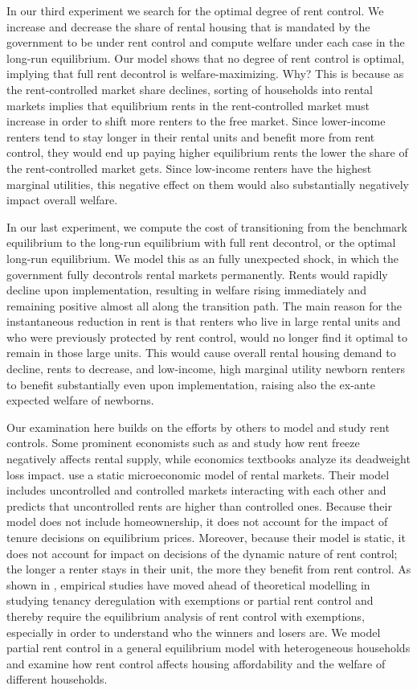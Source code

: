 \documentclass[parskip=full]{article}
\begin{document}
In our third experiment we search for the optimal degree of rent control. We increase and decrease the share of rental housing that is mandated by the government to be under rent control and compute welfare under each case in the long-run equilibrium. Our model shows that no degree of rent control is optimal, implying that full rent decontrol is welfare-maximizing. Why? This is because as the rent-controlled market share declines, sorting of households into rental markets implies that equilibrium rents in the rent-controlled market must increase in order to shift more renters to the free market. Since lower-income renters tend to stay longer in their rental units and benefit more from rent control, they would end up paying higher equilibrium rents the lower the share of the rent-controlled market gets. Since low-income renters have the highest marginal utilities, this negative effect on them would also substantially negatively impact overall welfare. 

In our last experiment, we compute the cost of transitioning from the benchmark equilibrium to the long-run equilibrium with full rent decontrol, or the optimal long-run equilibrium. We model this as an fully unexpected shock, in which the government fully decontrols rental markets permanently. Rents would rapidly decline upon implementation, resulting in welfare rising immediately and remaining positive almost all along the transition path. The main reason for the instantaneous reduction in rent is that renters who live in large rental units and who were previously protected by rent control, would no longer find it optimal to remain in those large units. This would cause overall rental housing demand to decline, rents to decrease, and low-income, high marginal utility newborn renters to benefit substantially even upon implementation, raising also the ex-ante expected welfare of newborns.

Our examination here builds on the efforts by others to model and study rent controls. Some prominent economists such as \citet{hayek-1929} and \citet{fs-1946} study how rent freeze negatively affects rental supply, while economics textbooks analyze its deadweight loss impact. \citet{fallis-1985} use a static microeconomic model of rental markets. Their model includes uncontrolled and controlled markets interacting with each other and predicts that uncontrolled rents are higher than controlled ones. Because their model does not include homeownership, it does not account for the impact of tenure decisions on equilibrium prices. Moreover, because their model is static, it does not account for impact on decisions of the dynamic nature of rent control; the longer a renter stays in their unit, the more they benefit from rent control. As shown in \citet{diamond-2019}, empirical studies have moved ahead of theoretical modelling in studying tenancy deregulation with exemptions or partial rent control and thereby require the equilibrium analysis of rent control with exemptions, especially in order to understand who the winners and losers are. We model partial rent control in a general equilibrium model with heterogeneous households and examine how rent control affects housing affordability and the welfare of different households.
\end{document}
